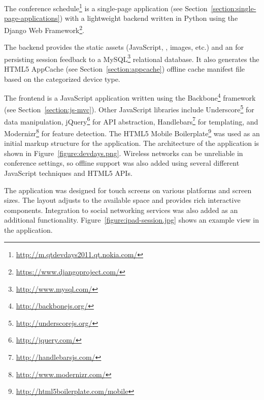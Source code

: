 The conference
schedule\footnote{\url{http://m.qtdevdays2011.qt.nokia.com/}} is a
single-page application (see
Section~\ref{section:single-page-applications}) with a lightweight
backend written in Python using the Django Web
Framework\footnote{\url{https://www.djangoproject.com/}}.

The backend provides the static assets (JavaScript, ,
images, etc.) and an  for persisting session feedback to a
MySQL\footnote{\url{http://www.mysql.com/}} relational database. It
also generates the HTML5 AppCache (see Section~\ref{section:appcache})
offline cache manifest file based on the categorized device type.

The frontend is a JavaScript application written using the
Backbone\footnote{\url{http://backbonejs.org/}}  framework
(see Section~\ref{section:js-mvc}). Other JavaScript libraries include
Underscore\footnote{\url{http://underscorejs.org/}} for data
manipulation, jQuery\footnote{\url{http://jquery.com/}} for 
API abstraction, Handlebars\footnote{\url{http://handlebarsjs.com/}}
for templating, and
Modernizr\footnote{\url{http://www.modernizr.com/}} for feature
detection. The HTML5 Mobile
Boilerplate\footnote{\url{http://html5boilerplate.com/mobile}} was
used as an initial markup structure for the application. The
architecture of the application is shown in
Figure~\ref{figure:devdays.png}. Wireless networks can be unreliable
in conference settings, so offline support was also added using
several different JavaScript techniques and HTML5 APIs.

The application was designed for touch screens on various platforms
and screen sizes. The layout adjusts to the available space and
provides rich interactive components. Integration to social networking
services was also added as an additional
functionality. Figure~\ref{figure:ipad-session.jpg} shows an example
view in the application.

